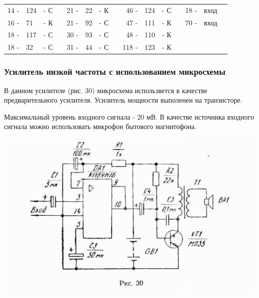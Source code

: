 \documentclass[12pt]{article}
\begin{document}
\hrulefill

\begin{tabular}{r l r p{0.5cm} r l r p{0.5cm} r l r p{0.5cm} r l r}
14 - & 124  & - С &   & 21 - & 22 & - К &    &  46 - & 124 & - С &   &  18 - & вход & \\
16 - & 71   & - К &   & 21 - & 92 & - С &    &  47 - & 111 & - К &   &  70 - & вход & \\
18 - & 117  & - С &   & 30 - & 93 & - С &    &  48 - & 110 & - К &   &       &      & \\
18 - & 32   & - С &   & 31 - & 44 & - С &    & 118 - & 123 & - К &   &       &      & \\
\end{tabular}

\hrulefill
\vspace*{3cm}
\subsubsection{Усилитель низкой частоты с использованием микросхемы}

В данном усилителе (рис. 30) микросхема использвется в качестве предварительного усилителя. Усилитель мощности выполенен на транзисторе.

Максимальный уровень входного сигнала - 20 мВ. В качестве источника входного сигнала можно использовать микрофон бытового магнитофона.

\newpage

\includegraphics[width=\textwidth]{ekon3_027_1}

\hrulefill
\end{document}
